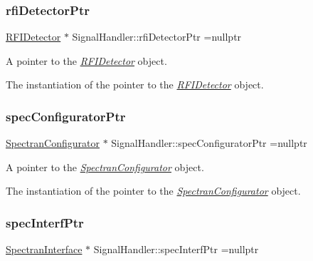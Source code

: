 \subsubsection{\texorpdfstring{rfi\+Detector\+Ptr}{rfiDetectorPtr}}
{\footnotesize\ttfamily \hyperlink{classRFIDetector}{R\+F\+I\+Detector} $\ast$ Signal\+Handler\+::rfi\+Detector\+Ptr =nullptr\hspace{0.3cm}{\ttfamily [static]}}



A pointer to the {\itshape \hyperlink{classRFIDetector}{R\+F\+I\+Detector}} object. 

The instantiation of the pointer to the {\itshape \hyperlink{classRFIDetector}{R\+F\+I\+Detector}} object. \mbox{\label{classSignalHandler_a0b9c75b3e3c928c01cc5e44d42e5ac38}} 
\subsubsection{\texorpdfstring{spec\+Configurator\+Ptr}{specConfiguratorPtr}}
{\footnotesize\ttfamily \hyperlink{classSpectranConfigurator}{Spectran\+Configurator} $\ast$ Signal\+Handler\+::spec\+Configurator\+Ptr =nullptr\hspace{0.3cm}{\ttfamily [static]}}



A pointer to the {\itshape \hyperlink{classSpectranConfigurator}{Spectran\+Configurator}} object. 

The instantiation of the pointer to the {\itshape \hyperlink{classSpectranConfigurator}{Spectran\+Configurator}} object. \mbox{\label{classSignalHandler_a855d0b79fcbacf50e4a1d12bd5d1bf53}} 
\subsubsection{\texorpdfstring{spec\+Interf\+Ptr}{specInterfPtr}}
{\footnotesize\ttfamily \hyperlink{classSpectranInterface}{Spectran\+Interface} $\ast$ Signal\+Handler\+::spec\+Interf\+Ptr =nullptr\hspace{0.3cm}{\ttfamily [static]}}




